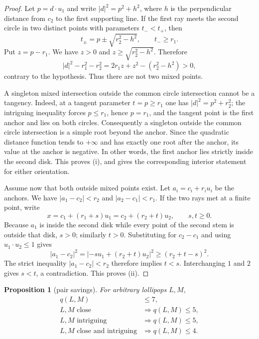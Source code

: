 \documentclass[11pt]{article}
\theoremstyle{plain}
\newtheorem{proposition}[theorem]{Proposition}
\theoremstyle{definition}
\theoremstyle{remark}
\newcommand{\1}{\mathbf 1}
\begin{document}
\begin{proof}
Let $p=d\cdot u_1$ and write $|d|^2=p^2+h^2$, where $h$ is the perpendicular
distance from $c_2$ to the first supporting line.  If the first ray meets the
second circle in two distinct points with parameters $t_-<t_+$, then
\[
 t_\pm=p\pm\sqrt{r_2^2-h^2},\qquad t_-\geq r_1.
\]
Put $z=p-r_1$.  We have $z>0$ and
$z\geq\sqrt{r_2^2-h^2}$.  Therefore
\[
 |d|^2-r_1^2-r_2^2
 =2r_1z+z^2-(r_2^2-h^2)>0,
\]
contrary to the hypothesis.  Thus there are not two mixed points.

A singleton mixed intersection outside the common circle intersection cannot
be a tangency.  Indeed, at a tangent parameter $t=p\geq r_1$ one has
$|d|^2=p^2+r_2^2$; the intriguing inequality forces $p\leq r_1$, hence
$p=r_1$, and the tangent point is the first anchor and lies on both circles.
Consequently a singleton outside the common circle intersection is a simple
root beyond the anchor.  Since the quadratic distance function tends to
$+\infty$ and has exactly one root after the anchor, its value at the anchor
is negative.  In other words, the first anchor lies strictly inside the
second disk.  This proves (i), and gives the corresponding interior statement
for either orientation.

Assume now that both outside mixed points exist.  Let
$a_i=c_i+r_i u_i$ be the anchors.  We have
$|a_1-c_2|<r_2$ and $|a_2-c_1|<r_1$.  If the two rays met at a finite point,
write
\[
 x=c_1+(r_1+s)u_1=c_2+(r_2+t)u_2,
 \qquad s,t\geq0.
\]
Because $a_1$ is inside the second disk while every point of the second stem
is outside that disk, $s>0$; similarly $t>0$.  Substituting for $c_2-c_1$ and
using $u_1\cdot u_2\leq1$ gives
\[
 |a_1-c_2|^2=|-s u_1+(r_2+t)u_2|^2
 \geq (r_2+t-s)^2.
\]
The strict inequality $|a_1-c_2|<r_2$ therefore implies $t<s$.  Interchanging
$1$ and $2$ gives $s<t$, a contradiction.  This proves (ii).
\end{proof}

\begin{proposition}[pair savings]\label{prop:pair-savings}
For arbitrary lollipops $L,M$,
\begin{align*}
 q(L,M)&\leq7,\\
 L,M\text{ close}&\Longrightarrow q(L,M)\leq5,\\
 L,M\text{ intriguing}&\Longrightarrow q(L,M)\leq5,\\
 L,M\text{ close and intriguing}&\Longrightarrow q(L,M)\leq4.
\end{align*}
\end{proposition}
\end{document}
